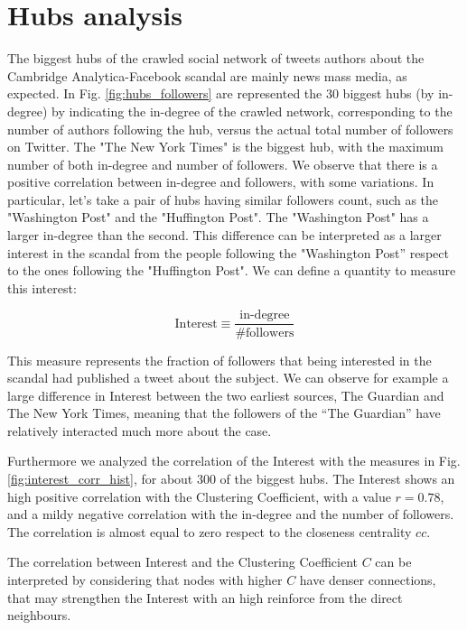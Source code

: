 \documentclass[11pt, twoside]{report}
\begin{document}
\clearpage
\section{Hubs analysis}

The biggest hubs of the crawled social network of tweets authors about the Cambridge Analytica-Facebook scandal are mainly
news mass media, as expected. In Fig. \ref{fig:hubs_followers} are represented the 30 biggest hubs (by in-degree) by indicating
the in-degree of the crawled network, corresponding to the number of authors following the hub, versus the actual total
number of followers on Twitter.
The "The New York Times" is the biggest hub, with the maximum number of both in-degree and number of followers.
We observe that there is a positive correlation between in-degree and followers, with some variations.
In particular, let's take a pair of hubs having similar followers count, such as the "Washington Post" and the "Huffington Post".
The "Washington Post" has a larger in-degree than the second.
This difference can be interpreted as a larger interest in the scandal from the people following the "Washington Post'' respect
to the ones following the "Huffington Post".
We can define a quantity to measure this interest:

\begin{equation}
  \text{Interest} \equiv \frac{ \text{in-degree} }{\text{\#followers}}
  \label{eq:interest}
\end{equation}

This measure represents the fraction of followers that being interested in the scandal had published a tweet about the subject.
We can observe for example a large difference in Interest between the two earliest sources, The Guardian and The New York Times,
meaning that the followers of the ``The Guardian'' have relatively interacted much more about the case.

Furthermore we analyzed the correlation of the Interest with the measures in Fig. \ref{fig:interest_corr_hist}, for about 300 of the biggest hubs.
The Interest shows an high positive correlation with the Clustering Coefficient, with a value $r=0.78$, and a mildy negative correlation with the in-degree and the number of followers. The correlation is almost equal to zero respect to the closeness centrality $cc$.

The correlation between Interest and the Clustering Coefficient $C$ can be interpreted
by considering that nodes with higher $C$ have denser connections, that may strengthen the Interest with an high reinforce from the
direct neighbours.
\end{document}
